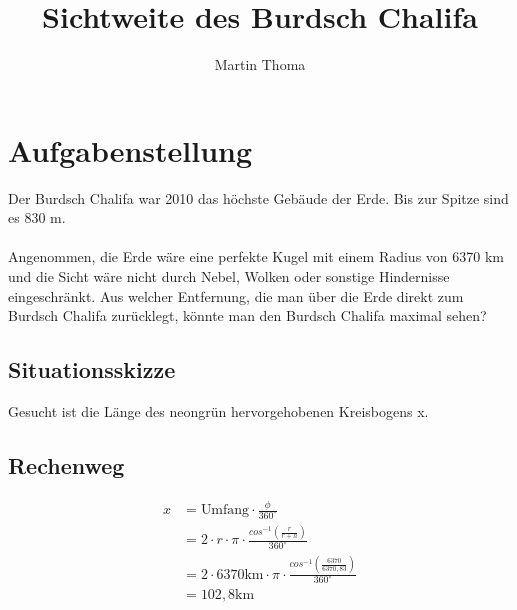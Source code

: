 \documentclass[a4paper,9pt]{scrartcl}
\begin{document}
 \title{Sichtweite des Burdsch Chalifa}
 \author{Martin Thoma}

 \setcounter{section}{1}
 \section*{Aufgabenstellung}
    Der Burdsch Chalifa war 2010 das höchste Gebäude der Erde. Bis zur Spitze
    sind es 830 m.\\
    \\
    Angenommen, die Erde wäre eine perfekte Kugel mit einem Radius von 6370 km
    und die Sicht wäre nicht durch Nebel, Wolken oder sonstige Hindernisse
    eingeschränkt. Aus welcher Entfernung, die man über die Erde direkt zum
    Burdsch Chalifa zurücklegt, könnte man den Burdsch Chalifa maximal sehen?

    \subsection{Situationsskizze}




    Gesucht ist die Länge des neongrün hervorgehobenen Kreisbogens x.

    \subsection{Rechenweg}
    \begin{align}
        x &= \text{Umfang} \cdot \frac{\phi}{360^\circ} \\
          &= 2 \cdot r \cdot \pi \cdot \frac{cos^{-1}(\frac{r}{r+h})}{360^\circ} \\
          &= 2 \cdot 6370 \text{km} \cdot \pi \cdot \frac{cos^{-1}(\frac{6370}{6370,83})}{360^\circ} \\
          &= 102,8 \text{km}
    \end{align}
\end{document}
